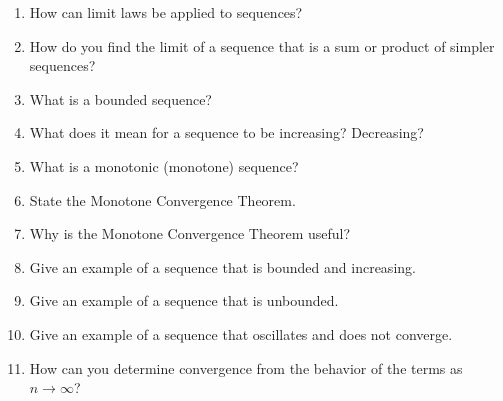 \begin{enumerate}
\begin{itemize}
      \item \(r = 1\)?
      \item \(r > 1\)?
    \end{itemize}
  \item How can limit laws be applied to sequences?
  \item How do you find the limit of a sequence that is a sum or product of simpler sequences?
  \item What is a bounded sequence?
  \item What does it mean for a sequence to be increasing? Decreasing?
  \item What is a monotonic (monotone) sequence?
  \item State the Monotone Convergence Theorem.
  \item Why is the Monotone Convergence Theorem useful?
  \item Give an example of a sequence that is bounded and increasing.
  \item Give an example of a sequence that is unbounded.
  \item Give an example of a sequence that oscillates and does not converge.
  \item How can you determine convergence from the behavior of the terms as \(n \to \infty\)?
\end{enumerate}
